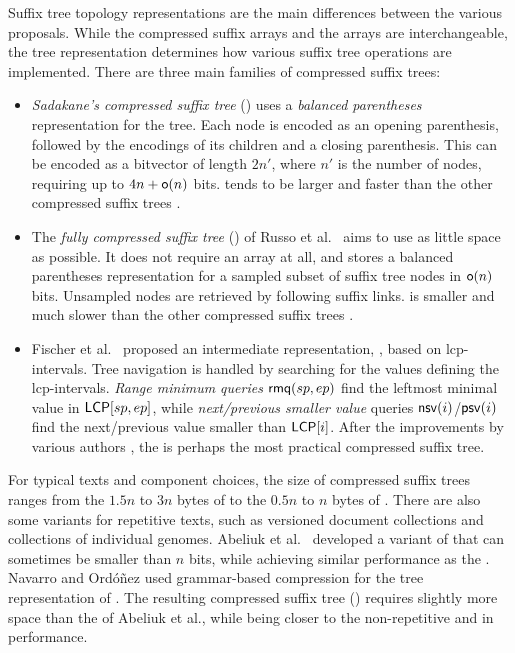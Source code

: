 Suffix tree topology representations are the main differences between the
various \CST{} proposals. While the compressed suffix arrays and the \LCP{} arrays
are interchangeable, the tree representation determines how various suffix tree
operations are implemented. There are three main families of compressed suffix
trees:
\begin{itemize}
\item \emph{Sadakane's compressed suffix tree} (\CSTsada) \cite{Sadakane2007}
uses a \emph{balanced parentheses} representation for the tree. Each node is
encoded as an opening parenthesis, followed by the encodings of its children
and a closing parenthesis. This can be encoded as a bitvector of length $2n'$,
where $n'$ is the number of nodes, requiring up to $4n+\mathsf{o}(n)$ bits.
\CSTsada{} tends to be larger and faster than the other compressed suffix
trees \cite{Gog2011a,Abeliuk2013}.
\item The \emph{fully compressed suffix tree} (\FCST) of Russo et
al.~\cite{Russo2011,Navarro2014a} aims to use as little space as possible. It
does not require an \LCP{} array at all, and stores a balanced parentheses
representation for a sampled subset of suffix tree nodes in $\mathsf{o}(n)$ bits.
Unsampled nodes are retrieved by following suffix links. \FCST{} is smaller
and much slower than the other compressed suffix trees
\cite{Russo2011,Abeliuk2013}.
\item Fischer et al.~\cite{Fischer2009a} proposed an intermediate
representation, \CSTnpr, based on lcp-intervals. Tree navigation is handled
by searching for the values defining the lcp-intervals. \emph{Range minimum
queries} $\mathsf{rmq}(sp,ep)$ find the leftmost minimal value in $\mathsf{LCP}[sp,ep]$,
while \emph{next/previous smaller value} queries $\mathsf{nsv}(i)$/$\mathsf{psv}(i)$ find
the next/previous \LCP{} value smaller than $\mathsf{LCP}[i]$. After the improvements
by various authors \cite{Ohlebusch2009,Ohlebusch2010,Gog2011a,Abeliuk2013},
the \CSTnpr{} is perhaps the most practical compressed suffix tree.
\end{itemize}

For typical texts and component choices, the size of compressed suffix trees
ranges from the $1.5n$ to $3n$ bytes of \CSTsada{} to the $0.5n$ to $n$ bytes
of \FCST{} \cite{Gog2011a,Abeliuk2013}. There are also some \CST{} variants
for repetitive texts, such as versioned document collections and collections
of individual genomes. Abeliuk et al.~\cite{Abeliuk2013} developed a variant
of \CSTnpr{} that can sometimes be smaller than $n$ bits, while achieving
similar performance as the \FCST. Navarro and Ordóñez \cite{Navarro2014} used
grammar-based compression for the tree representation of \CSTsada. The
resulting compressed suffix tree (\GCT) requires slightly more space than the
\CSTnpr{} of Abeliuk et al., while being closer to the non-repetitive
\CSTsada{} and \CSTnpr{} in performance.

